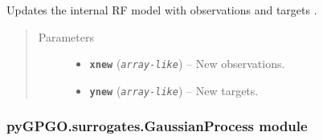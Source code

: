\documentclass[letterpaper,10pt,english]{sphinxmanual}
\begin{document}
\begin{fulllineitems}

\begin{fulllineitems}
\label{pyGPGO.surrogates.BoostedTrees:pyGPGO.surrogates.BoostedTrees.BoostedTrees.update}
Updates the internal RF model with observations  and targets .
\begin{quote}\begin{description}
\item[{Parameters}] \leavevmode\begin{itemize}
\item {} 
\textbf{\texttt{xnew}} (\emph{\texttt{array-like}}) -- New observations.

\item {} 
\textbf{\texttt{ynew}} (\emph{\texttt{array-like}}) -- New targets.

\end{itemize}

\end{description}\end{quote}

\end{fulllineitems}


\end{fulllineitems}



\subsubsection{pyGPGO.surrogates.GaussianProcess module}
\label{pyGPGO.surrogates.GaussianProcess:pygpgo-surrogates-gaussianprocess-module}\label{pyGPGO.surrogates.GaussianProcess:module-pyGPGO.surrogates.GaussianProcess}\label{pyGPGO.surrogates.GaussianProcess::doc}
\end{document}
